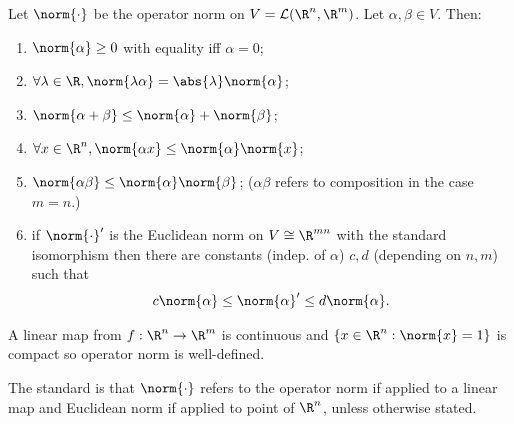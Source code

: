 \begin{proposition} \label{prp:2.2}
    Let $\norm{\cdot}$ be the operator norm on $V = \mathcal{L}(\R^n,\R^m)$. Let $\alpha,\beta\in V$. Then:
    \begin{enumerate}
        \item $\norm{\alpha}\ge 0$ with equality iff $\alpha = 0$;
        \item $\forall \lambda\in \R, \norm{\lambda \alpha} = \abs{\lambda}\norm{ \alpha}$;
        \item $\norm{\alpha + \beta} \leq \norm{\alpha} + \norm{\beta}$;
        \item $\forall x\in \R^n, \norm{\alpha x} \leq \norm{\alpha}\norm{x}$;
        \item $\norm{\alpha\beta} \leq \norm{\alpha}\norm{\beta}$; ($\alpha\beta$ refers to composition in the case $m=n$.)
        \item if $\norm{\cdot}'$ is the Euclidean norm on $V\cong \R^{mn}$ with the standard isomorphism then there are constants (indep. of $\alpha$) $c,d$ (depending on $n,m$) such that \begin{align*}
            c\norm{\alpha} \leq \norm{\alpha}' \leq d\norm{\alpha}.
        \end{align*}
    \end{enumerate}
\end{proposition}

\begin{remark}
    A linear map from $f:\R^n\to \R^m$ is continuous and $\Set{x\in \R^n}{\norm{x} = 1}$ is compact so operator norm is well-defined.
\end{remark}

\begin{notation}
    The standard is that $\norm{\cdot}$ refers to the operator norm if applied to a linear map and Euclidean norm if applied to point of $\R^n$, unless otherwise stated.
\end{notation}

